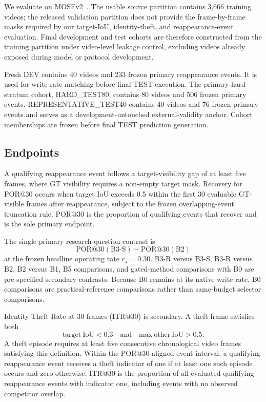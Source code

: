 \documentclass[10pt,twocolumn,letterpaper]{article}
\begin{document}
We evaluate on MOSEv2~\cite{MOSEv2}.  The usable source partition contains
3,666 training videos; the released validation partition does not provide
the frame-by-frame masks required by our target-IoU, identity-theft, and
reappearance-event evaluation.  Final development and test cohorts are
therefore constructed from the training partition under video-level leakage
control, excluding videos already exposed during model or protocol
development.

Fresh DEV contains 40 videos and 233 frozen primary reappearance events.
It is used for write-rate matching before final TEST execution.  The primary
hard-stratum cohort, HARD\_TEST80, contains 80 videos and 506 frozen primary
events.  REPRESENTATIVE\_TEST40 contains 40 videos and 76 frozen primary
events and serves as a development-untouched external-validity anchor.
Cohort memberships are frozen before final TEST prediction generation.

\subsection{Endpoints}

A qualifying reappearance event follows a target-visibility gap of at least
five frames, where GT visibility requires a non-empty target mask.  Recovery
for POR@30 occurs when target IoU exceeds 0.5 within the first 30 evaluable
GT-visible frames after reappearance, subject to the frozen overlapping-event
truncation rule.  POR@30 is the proportion of qualifying events that recover
and is the sole primary endpoint.

The single primary research-question contrast is
\[
    \mathrm{POR@30}(\mathrm{B3\mbox{-}S})
    -
    \mathrm{POR@30}(\mathrm{B2})
\]
at the frozen headline operating rate \(r_\star=0.30\).  B3-R versus B3-S,
B3-R versus B2, B2 versus B1, B5 comparisons, and gated-method comparisons
with B0 are pre-specified secondary contrasts.  Because B0 remains at its
native write rate, B0 comparisons are practical-reference comparisons rather
than same-budget selector comparisons.

Identity-Theft Rate at 30 frames (ITR@30) is secondary.  A theft frame
satisfies both
\[
    \mathrm{target\ IoU}<0.3
    \quad\text{and}\quad
    \mathrm{max\ other\ IoU}>0.5.
\]
A theft episode requires at least five consecutive chronological video frames
satisfying this definition.  Within the POR@30-aligned event interval, a
qualifying reappearance event receives a theft indicator of one if at least
one such episode occurs and zero otherwise.  ITR@30 is the proportion of all
evaluated qualifying reappearance events with indicator one, including
events with no observed competitor overlap.
\end{document}
